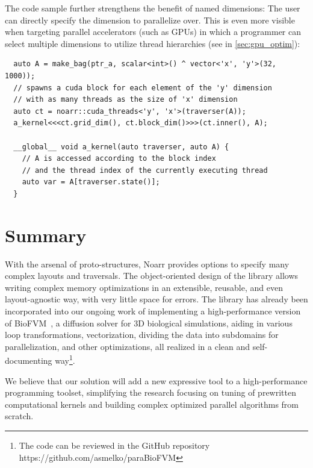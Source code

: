 The code sample further strengthens the benefit of named dimensions: The user can directly specify the dimension to parallelize over. This is even more visible when targeting parallel accelerators (such as GPUs) in which a programmer can select multiple dimensions to utilize thread hierarchies (see  in \cref{sec:gpu_optim}):

\begin{verbatim}
  auto A = make_bag(ptr_a, scalar<int>() ^ vector<'x', 'y'>(32, 1000));
  // spawns a cuda block for each element of the 'y' dimension
  // with as many threads as the size of 'x' dimension
  auto ct = noarr::cuda_threads<'y', 'x'>(traverser(A));
  a_kernel<<<ct.grid_dim(), ct.block_dim()>>>(ct.inner(), A);

  __global__ void a_kernel(auto traverser, auto A) {
    // A is accessed according to the block index
    // and the thread index of the currently executing thread
    auto var = A[traverser.state()];
  }
\end{verbatim}

\section{Summary}

With the arsenal of proto-structures, Noarr provides options to specify many complex layouts and traversals. The object-oriented design of the library allows writing complex memory optimizations in an extensible, reusable, and even layout-agnostic way, with very little space for errors. The library has already been incorporated into our ongoing work of implementing a high-performance version of BioFVM~\cite{ghaffarizadeh2016biofvm}, a diffusion solver for 3D biological simulations, aiding in various loop transformations, vectorization, dividing the data into subdomains for parallelization, and other optimizations, all realized in a clean and self-documenting way\footnote{The code can be reviewed in the GitHub repository https://github.com/asmelko/paraBioFVM}.

We believe that our solution will add a new expressive tool to a high-performance programming toolset, simplifying the research focusing on tuning of prewritten computational kernels and building complex optimized parallel algorithms from scratch.


